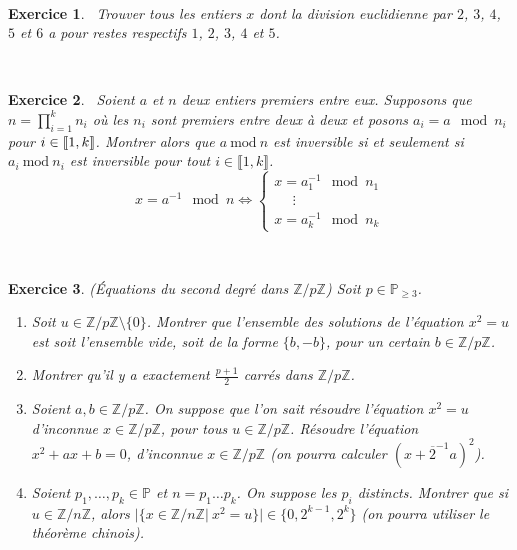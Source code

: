 \documentclass[11pt,a4paper]{article}
\newtheorem{ex}{Exercice}
\newcommand{\Z}{\mathbb{Z}}
\begin{document}
\



\begin{ex}\label{systeme_non_premier}\
Trouver tous les entiers $x$ dont la division euclidienne par $2$, $3$, $4$, $5$ et $6$ a pour restes respectifs $1$, $2$, $3$, $4$ et $5$.
\end{ex}
\



\begin{ex}\
Soient $a$ et $n$ deux entiers premiers entre eux. Supposons que $n=\prod_{i=1}^k n_i$ où les $n_i$ sont premiers entre deux à deux et posons $ a_i= a \! \mod n_i$ pour $i \in \llbracket 1,k \rrbracket$. Montrer alors que $a\mathrm{\ mod\ }n$ est inversible si et seulement si $a_i \mathrm{\ mod\ }n_i$ est inversible pour tout $i\in \llbracket 1,k\rrbracket$. 
$$ x=a^{-1}\! \! \! \! \!  \mod n \Longleftrightarrow \left \{ \begin{array}{c}
x= a_1^{-1} \! \! \! \! \! \mod n_1 \\
\ \ \ \ \ \ \vdots  \\
x= a_k^{-1} \! \! \! \! \! \mod n_k 
\end{array} \right.    $$

\end{ex}


\


\begin{ex}\label{exEquation_degre_2_F_p}(Équations du second degré dans $\Z/p\Z$)
Soit $p\in \mathbb{P}_{\geq 3}$. 
\begin{enumerate}
\item Soit $u\in \Z/p\Z\setminus\{0\}$. Montrer que l'ensemble des solutions de l'équation $x^2=u$ est soit l'ensemble vide, soit de la forme $\{b,-b\}$, pour un certain $b\in \Z/p\Z$.

\item Montrer qu'il y a exactement $\frac{p+1}{2}$ carrés dans $\Z/p\Z$.

\item Soient $a,b\in \Z/p\Z$. On suppose que l'on sait résoudre l'équation $x^2=u$ d'inconnue $x\in \Z/p\Z$, pour 
tous $u\in \Z/p\Z$. Résoudre l'équation $x^2+ax+b=0$, d'inconnue $x\in \Z/p\Z$ (on pourra calculer $(x+\overline{2}^{-1} a)^2$). 

\item Soient $p_1,\ldots,p_k\in \mathbb{P}$ et $n=p_1\ldots p_k$. On suppose les $p_i$ distincts. Montrer que si $u\in \Z/n\Z$, alors $|\{x\in \Z/n\Z|\ x^2=u\}|\in \{0,2^{k-1},2^k\}$ (on pourra utiliser le théorème  chinois). 

\end{enumerate}

\end{ex}
\end{document}
